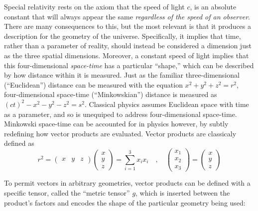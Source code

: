     Special relativity rests on the axiom that the speed of light $c$,
        is an absolute constant that will always appear the same
        \textit{regardless of the speed of an observer}.
    There are many consequences to this, but the most relevant is that
        it produces a description for the geometry of the universe.
    Specifically, it implies that time, rather than a parameter of reality,
        should instead be considered a dimension just as the three spatial dimensions.
    Moreover, a constant speed of light implies that this four-dimensional \textit{space-time} has a particular ``shape,''
        which can be described by how distance within it is measured.
    Just as the familiar three-dimensional (``Euclidean'') distance can be measured with the equation $x^2+y^2+z^2=r^2$,
        four-dimensional space-time (``Minkowskian'') distance is measured as $(ct)^2-x^2-y^2-z^2 = s^2$.
    Classical physics assumes Euclidean space with time as a parameter,
        and so is unequiped to address four-dimensional space-time.
    Minkowski space-time can be accounted for in physics however,
        by subtly redefining how vector products are evaluated.
    Vector products are classicaly defined as 
    \begin{equation}
        r^2 = \begin{pmatrix} x & y & z\end{pmatrix} \begin{pmatrix} x \\ y \\ z \end{pmatrix} = \sum\limits_{i=1}^3 x_i x_i
        \quad , \quad \begin{pmatrix}x_1 \\ x_2 \\ x_3 \end{pmatrix} = \begin{pmatrix} x \\ y \\ z \end{pmatrix} 
    \end{equation}

    To permit vectors in arbitrary geometries,
        vector products can be defined with a specific tensor, called the ``metric tensor'' $g$,
        which is inserted between the product's factors and encodes the shape of the particular geometry being used:

